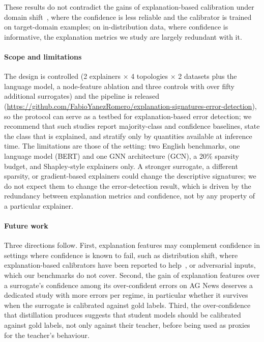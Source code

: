 \documentclass[preprint, times, review, 10pt]{elsarticle}
\begin{document}
These results do not contradict the gains of explanation-based calibration under domain shift~\cite{ye2022calibrating}, where the confidence is less reliable and the calibrator is trained on target-domain examples; on in-distribution data, where confidence is informative, the explanation metrics we study are largely redundant with it.

\paragraph{\textbf{Scope and limitations}}
The design is controlled (2 explainers \(\times\) 4 topologies \(\times\) 2 datasets plus the language model, a node-feature ablation and three controls with over fifty additional surrogates) and the pipeline is released (\url{https://github.com/FabioYanezRomero/explanation-signatures-error-detection}), so the protocol can serve as a testbed for explanation-based error detection; we recommend that such studies report majority-class and confidence baselines, state the class that is explained, and stratify only by quantities available at inference time. The limitations are those of the setting: two English benchmarks, one language model (BERT) and one GNN architecture (GCN), a 20\% sparsity budget, and Shapley-style explainers only. A stronger surrogate, a different sparsity, or gradient-based explainers could change the descriptive signatures; we do not expect them to change the error-detection result, which is driven by the redundancy between explanation metrics and confidence, not by any property of a particular explainer.

\paragraph{\textbf{Future work}}
Three directions follow. First, explanation features may complement confidence in settings where confidence is known to fail, such as distribution shift, where explanation-based calibrators have been reported to help~\cite{ye2022calibrating}, or adversarial inputs, which our benchmarks do not cover. Second, the gain of explanation features over a surrogate's confidence among its over-confident errors on AG News deserves a dedicated study with more errors per regime, in particular whether it survives when the surrogate is calibrated against gold labels. Third, the over-confidence that distillation produces suggests that student models should be calibrated against gold labels, not only against their teacher, before being used as proxies for the teacher's behaviour.
\end{document}
